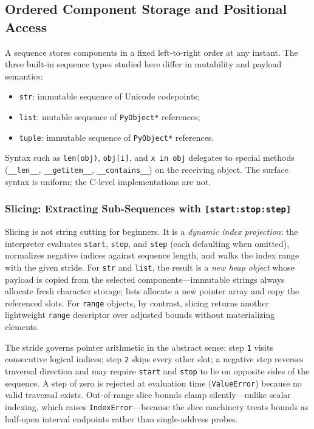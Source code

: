 \subsection{Ordered Component Storage and Positional Access}

A sequence stores components in a fixed left-to-right order at any instant. The three built-in sequence types studied here differ in mutability and payload semantics:

\begin{itemize}
    \item \texttt{str}: immutable sequence of Unicode codepoints;
    \item \texttt{list}: mutable sequence of \texttt{PyObject*} references;
    \item \texttt{tuple}: immutable sequence of \texttt{PyObject*} references.
\end{itemize}

Syntax such as \texttt{len(obj)}, \texttt{obj[i]}, and \texttt{x in obj} delegates to special methods (\texttt{\_\_len\_\_}, \texttt{\_\_getitem\_\_}, \texttt{\_\_contains\_\_}) on the receiving object. The surface syntax is uniform; the C-level implementations are not.

\subsubsection{Slicing: Extracting Sub-Sequences with \texttt{[start:stop:step]}}

Slicing is not string cutting for beginners. It is a \emph{dynamic index projection}: the interpreter evaluates \texttt{start}, \texttt{stop}, and \texttt{step} (each defaulting when omitted), normalizes negative indices against sequence length, and walks the index range with the given stride. For \texttt{str} and \texttt{list}, the result is a \emph{new heap object} whose payload is copied from the selected components---immutable strings always allocate fresh character storage; lists allocate a new pointer array and copy the referenced slots. For \texttt{range} objects, by contrast, slicing returns another lightweight \texttt{range} descriptor over adjusted bounds without materializing elements.

The stride governs pointer arithmetic in the abstract sense: step \texttt{1} visits consecutive logical indices; step \texttt{2} skips every other slot; a negative step reverses traversal direction and may require \texttt{start} and \texttt{stop} to lie on opposite sides of the sequence. A step of zero is rejected at evaluation time (\texttt{ValueError}) because no valid traversal exists. Out-of-range slice bounds clamp silently---unlike scalar indexing, which raises \texttt{IndexError}---because the slice machinery treats bounds as half-open interval endpoints rather than single-address probes.

